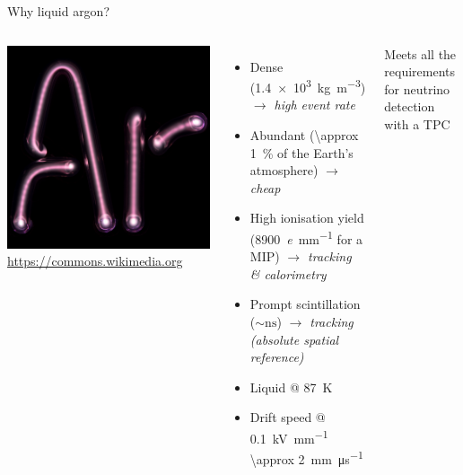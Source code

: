 \documentclass[]{beamer}
\newcommand*{\emphcol}{blue}
\begin{document}
\begin{frame}{Why liquid argon?}
	\begin{columns}[c]
		\centering
		\includegraphics[width=\textwidth]{defence/ArTube}\\
		{\tiny\url{https://commons.wikimedia.org}}
		\begin{itemize}
			\item Dense (\SI{1.4e3}{\kilo\gram\per\cubic\metre}) \emph{$\rightarrow$ high event rate}
			\item Abundant (\SI{\approx 1}{\percent} of the Earth's atmosphere) \emph{$\rightarrow$ cheap}
			\item High ionisation yield (\SI{8900}{\elementarycharge\per\milli\metre} for a MIP) \emph{$\rightarrow$ tracking \& calorimetry}
			\item Prompt scintillation ($\sim \si{\nano\second}$) \emph{$\rightarrow$ tracking (absolute spatial reference)}
			\item Liquid @ \SI{87}{\kelvin}
			\item Drift speed @ \SI{0.1}{\kilo\volt\per\milli\meter} \SI{\approx 2}{\milli\meter\per\micro\second}
		\end{itemize}
		{\color{\emphcol} Meets all the requirements for neutrino detection with a TPC}
	\end{columns}
\end{frame}
\end{document}
